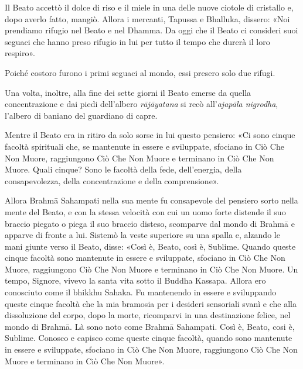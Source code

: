 Il Beato accettò il dolce di riso e il miele in una delle nuove ciotole di
cristallo e, dopo averlo fatto, mangiò. Allora i mercanti, Tapussa e Bhalluka,
dissero: «Noi prendiamo rifugio nel Beato e nel Dhamma. Da oggi che il Beato ci
consideri suoi seguaci che hanno preso rifugio in lui per tutto il tempo che
durerà il loro respiro».

Poiché costoro furono i primi seguaci al mondo, essi presero solo due rifugi.


 Una volta, inoltre, alla fine dei sette giorni il Beato
emerse da quella concentrazione e dai piedi dell’albero \emph{rājāyatana} si
recò all’\emph{ajapāla nigrodha}, l’albero di baniano del guardiano di capre.

 Mentre il Beato era in ritiro da solo sorse in lui questo
pensiero: «Ci sono cinque facoltà spirituali che, se mantenute in essere e
sviluppate, sfociano in Ciò Che Non Muore, raggiungono Ciò Che Non Muore e
terminano in Ciò Che Non Muore. Quali cinque? Sono le facoltà della fede,
dell’energia, della consapevolezza, della concentrazione e della comprensione».

\label{pag45}Allora Brahmā Sahampati nella sua mente fu consapevole del pensiero
sorto nella mente del Beato, e con la stessa velocità con cui un uomo forte
distende il suo braccio piegato o piega il suo braccio disteso, scomparve dal
mondo di Brahmā e apparve di fronte a lui. Sistemò la veste superiore su una
spalla e, alzando le mani giunte verso il Beato, disse: «Così è, Beato, così è,
Sublime. Quando queste cinque facoltà sono mantenute in essere e sviluppate,
sfociano in Ciò Che Non Muore, raggiungono Ciò Che Non Muore e terminano in Ciò
Che Non Muore. Un tempo, Signore, vivevo la santa vita sotto il Buddha Kassapa.
Allora ero conosciuto come il bhikkhu Sahaka. Fu mantenendo in essere e
sviluppando queste cinque facoltà che la mia bramosia per i desideri sensoriali
svanì e che alla dissoluzione del corpo, dopo la morte, ricomparvi in una
destinazione felice, nel mondo di Brahmā. Là sono noto come Brahmā Sahampati.
Così è, Beato, cosi è, Sublime. Conosco e capisco come queste cinque facoltà,
quando sono mantenute in essere e sviluppate, sfociano in Ciò Che Non Muore,
raggiungono Ciò Che Non Muore e terminano in Ciò Che Non Muore».


